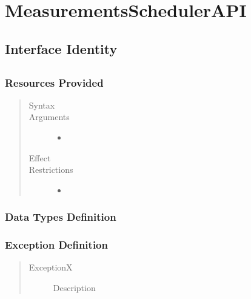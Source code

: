 \section{MeasurementsSchedulerAPI}

\subsection{Interface Identity}

\subsection{\method{}}

\subsubsection{Resources Provided}

\begin{quote}
	\begin{description}
		\item[Syntax] 
		\item[Arguments] 
		\begin{itemize}
		  \item 
		\end{itemize}
		\item[Effect]
		\item[Restrictions] 
		\begin{itemize}
		  \item 
		\end{itemize}
	\end{description} 
\end{quote}

\subsubsection{Data Types Definition}

\begin{quote}
	\begin{description}
		\item[] 
	\end{description} 
\end{quote}

\subsubsection{Exception Definition} 

\begin{quote}
	\begin{description}
		\item[ExceptionX] Description
	\end{description} 
\end{quote}
